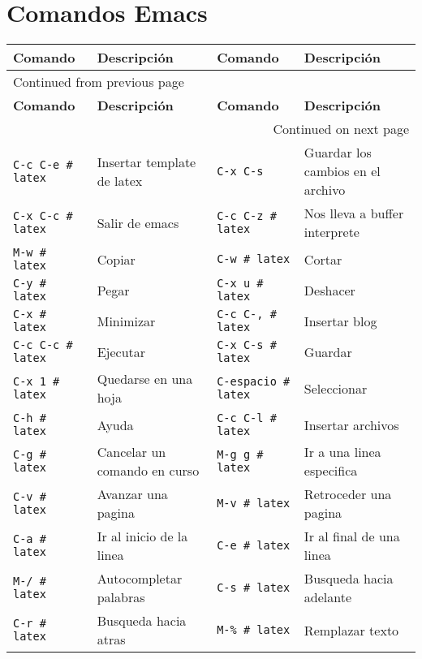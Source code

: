 \documentclass{article}
\begin{document}
\section{Comandos Emacs}
\label{sec:orga01232a}
\begin{longtable}{llll}
\textbf{Comando} & \textbf{Descripción} & \textbf{Comando} & \textbf{Descripción}\\[0pt]
\hline
\endfirsthead
\multicolumn{4}{l}{Continued from previous page} \\[0pt]
\hline

\textbf{Comando} & \textbf{Descripción} & \textbf{Comando} & \textbf{Descripción} \\[0pt]

\hline
\endhead
\hline\multicolumn{4}{r}{Continued on next page} \\
\endfoot
\endlastfoot
\hline
\texttt{C-c C-e \# latex} & Insertar template de  latex & \texttt{C-x C-s} & Guardar los cambios en el archivo\\[0pt]
\texttt{C-x C-c \# latex} & Salir de emacs & \texttt{C-c C-z     \# latex} & Nos lleva a buffer interprete\\[0pt]
\texttt{M-w     \# latex} & Copiar & \texttt{C-w       \# latex} & Cortar\\[0pt]
\texttt{C-y     \# latex} & Pegar & \texttt{C-x u     \# latex} & Deshacer\\[0pt]
\texttt{C-x     \# latex} & Minimizar & \texttt{C-c C-,   \# latex} & Insertar blog\\[0pt]
\texttt{C-c C-c \# latex} & Ejecutar & \texttt{C-x C-s   \# latex} & Guardar\\[0pt]
\texttt{C-x 1   \# latex} & Quedarse en una hoja & \texttt{C-espacio \# latex} & Seleccionar\\[0pt]
\texttt{C-h     \# latex} & Ayuda & \texttt{C-c C-l   \# latex} & Insertar archivos\\[0pt]
\texttt{C-g     \# latex} & Cancelar un comando en curso & \texttt{M-g g     \# latex} & Ir a una linea especifica\\[0pt]
\texttt{C-v     \# latex} & Avanzar una pagina & \texttt{M-v       \# latex} & Retroceder una pagina\\[0pt]
\texttt{C-a     \# latex} & Ir al inicio de la linea & \texttt{C-e       \# latex} & Ir al final de una linea\\[0pt]
\texttt{M-/     \# latex} & Autocompletar palabras & \texttt{C-s       \# latex} & Busqueda hacia adelante\\[0pt]
\texttt{C-r     \# latex} & Busqueda hacia atras & \texttt{M-\%       \# latex} & Remplazar texto\\[0pt]

\end{longtable}
\end{document}
